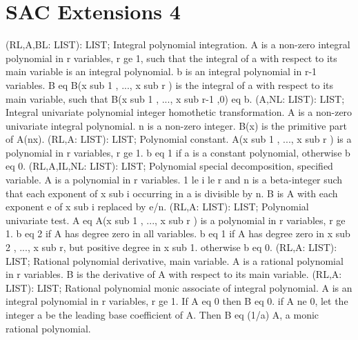 \section{ SAC Extensions 4  } 
 (RL,A,BL: LIST): LIST; \eproc
\bcom Integral polynomial integration. A is a non-zero integral
polynomial in r variables, r ge 1, such that the integral of a with
respect to its main variable is an integral polynomial.  b is an
integral polynomial in r-1 variables.  B eq B(x sub 1 , ..., x sub r )
is the integral of a with respect to its main variable, such that
B(x sub 1 , ..., x sub r-1 ,0) eq b. \ecom 
{} (A,NL: LIST): LIST; \eproc
\bcom Integral univariate polynomial integer homothetic transformation.
A is a non-zero univariate integral polynomial.  n is a non-zero
integer. B(x) is the primitive part of A(nx). \ecom 
{} (RL,A: LIST): LIST; \eproc
\bcom Polynomial constant. A(x sub 1 , ..., x sub r ) is a polynomial
in r variables, r ge 1.  b eq 1 if a is a constant polynomial,
otherwise b eq 0. \ecom 
{} (RL,A,IL,NL: LIST): LIST; \eproc
\bcom Polynomial special decomposition, specified variable. A is a
polynomial in r variables.  1 le i le r and n is a beta-integer such
that each exponent of x sub i occurring in a is divisible by n.
B is A with each exponent e of x sub i replaced by e/n. \ecom 
{} (RL,A: LIST): LIST; \eproc
\bcom Polynomial univariate test. A eq A(x sub 1 , ..., x sub r ) is a
polynomial in r variables, r ge 1.  b eq 2 if A has degree zero in all
variables.  b eq 1 if A has degree zero in x sub 2 , ..., x sub r, but
positive degree in x sub 1. otherwise b eq 0. \ecom 
{} (RL,A: LIST): LIST; \eproc
\bcom Rational polynomial derivative, main variable. A is a rational
polynomial in r variables.  B is the derivative of A with respect to
its main variable. \ecom 
{} (RL,A: LIST): LIST; \eproc
\bcom Rational polynomial monic associate of integral polynomial.
A is an integral polynomial in r variables, r ge 1.  If A eq 0
then B eq 0.  if A ne 0, let the integer a be the leading base
coefficient of A. Then B eq (1/a) A, a monic rational polynomial. \ecom 
